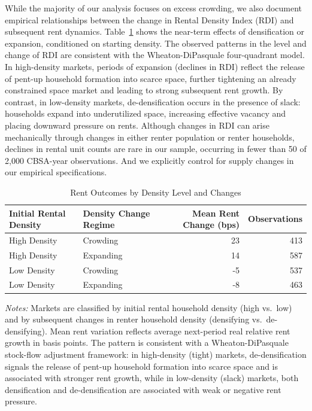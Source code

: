 \documentclass[pdflatex,sn-basic]{sn-jnl}%
\theoremstyle{thmstyleone}%
\theoremstyle{thmstyletwo}%
\theoremstyle{thmstylethree}%
\begin{document}
While the majority of our analysis focuses on excess crowding, we also document empirical relationships between the change in Rental Density Index (RDI) and subsequent rent dynamics. Table~\ref{tab:wheaton_dipasquale_density} shows the near-term effects of  densification or expansion, conditioned on starting density. The observed patterns in the level and change of RDI are consistent with the Wheaton-DiPasquale four-quadrant model. In high-density markets, periods of expansion (declines in RDI) reflect the release of pent-up household formation into scarce space, further tightening an already constrained space market and leading to strong subsequent rent growth. By contrast, in low-density markets, de-densification occurs in the presence of slack: households expand into underutilized space, increasing effective vacancy and placing downward pressure on rents. Although changes in RDI can arise mechanically through changes in either renter population or renter households, declines in rental unit counts are rare in our sample, occurring in fewer than 50 of 2,000 CBSA-year observations. And we explicitly control for supply changes in our empirical specifications.

\begin{table}[htbp]
\centering
\caption{Rent Outcomes by Density Level and Changes }
\label{tab:wheaton_dipasquale_density}
\begin{tabular}{l l r r}
\hline
Initial Rental Density & Density Change Regime & Mean Rent Change (bps) & Observations \\
\hline
High Density & Crowding     & 23  & 413 \\
High Density & Expanding	& 14  & 587 \\
Low Density  & Crowding     & -5  & 537 \\
Low Density  & Expanding 	& -8  & 463 \\
\hline
\end{tabular}
\begin{minipage}{0.9\linewidth}
\footnotesize
\emph{Notes:} Markets are classified by initial rental household density (high vs.\ low) and by subsequent changes in renter household density (densifying vs.\ de-densifying). Mean rent variation reflects average next-period real relative rent growth in basis points. The pattern is consistent with a Wheaton-DiPasquale stock-flow adjustment framework: in high-density (tight) markets, de-densification signals the release of pent-up household formation into scarce space and is associated with stronger rent growth, while in low-density (slack) markets, both densification and de-densification are associated with weak or negative rent pressure.
\end{minipage}
\end{table}
\end{document}
